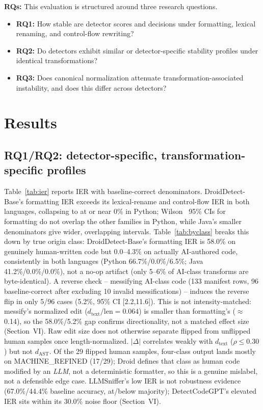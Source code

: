 \documentclass[10pt,conference]{IEEEtran}
\begin{document}
\textbf{RQs:} This evaluation is structured around three research questions.
\begin{itemize}
\item \textbf{RQ1:} How stable are detector scores and decisions under formatting, lexical renaming, and control-flow rewriting?
\item \textbf{RQ2:} Do detectors exhibit similar or detector-specific stability profiles under identical transformations?
\item \textbf{RQ3:} Does canonical normalization attenuate transformation-associated instability, and does this differ across detectors?
\end{itemize}

\section{Results}

\subsection{RQ1/RQ2: detector-specific, transformation-specific profiles}

Table~\ref{tab:ier} reports IER with baseline-correct denominators. DroidDetect-Base's formatting IER exceeds its lexical-rename and control-flow IER in both languages, collapsing to at or near 0\% in Python; Wilson~\cite{wilson1927} 95\% CIs for formatting do not overlap the other families in Python, while Java's smaller denominators give wider, overlapping intervals. Table~\ref{tab:byclass} breaks this down by true origin class: DroidDetect-Base's formatting IER is 58.0\% on genuinely human-written code but 0.0--4.3\% on actually AI-authored code, consistently in both languages (Python 66.7\%/0.0\%/6.5\%; Java 41.2\%/0.0\%/0.0\%), not a no-op artifact (only 5--6\% of AI-class transforms are byte-identical). A reverse check -- messifying AI-class code (133 manifest rows, 96 baseline-correct after excluding 10 invalid messifications) -- induces the reverse flip in only 5/96 cases (5.2\%, 95\% CI [2.2,11.6]). This is not intensity-matched: messify's normalized edit ($d_\text{text}/\text{len}{=}0.064$) is smaller than formatting's ($\approx$0.14), so the 58.0\%/5.2\% gap confirms directionality, not a matched effect size (Section~VI). Raw edit size does not otherwise separate flipped from unflipped human samples once length-normalized. $|\Delta|$ correlates weakly with $d_\text{text}$ ($\rho{\le}0.30$) but not $d_\text{AST}$. Of the 29 flipped human samples, four-class output lands mostly on MACHINE\_REFINED (17/29); Droid defines that class as human code modified by an \emph{LLM}, not a deterministic formatter, so this is a genuine mislabel, not a defensible edge case. LLMSniffer's low IER is not robustness evidence (67.0\%/44.4\% baseline accuracy, at/below majority); DetectCodeGPT's elevated IER sits within its 30.0\% noise floor (Section~VI).
\end{document}
